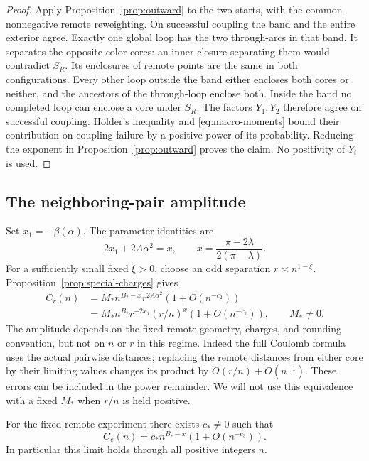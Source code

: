 \begin{proof}
Apply Proposition~\ref{prop:outward} to the two starts, with the common
nonnegative remote reweighting. On successful coupling the band and
the entire exterior agree. Exactly one global loop has the two
through-arcs in that band. It separates the opposite-color cores:
an inner closure separating them would contradict $S_R$. Its
enclosures of remote points are the same in both configurations.
Every other loop outside the band either encloses both cores or
neither, and the ancestors of the through-loop enclose both.
Inside the band no completed loop can enclose a core under $S_R$.
The factors $Y_1,Y_2$ therefore agree on successful coupling.
H\"older's inequality and \eqref{eq:macro-moments} bound their
contribution on coupling failure by a positive power of its probability.
Reducing the exponent in Proposition~\ref{prop:outward} proves the
claim. No positivity of $Y_i$ is used.
\end{proof}

\subsection{The neighboring-pair amplitude}

Set $x_1=-\beta(\alpha)$. The parameter identities are
\begin{equation}\label{eq:exponent-identity}
 2x_1+2A\alpha^2=x,
 \qquad
 x=\frac{\pi-2\lambda}{2(\pi-\lambda)}.
\end{equation}
For a sufficiently small fixed $\xi>0$, choose an odd separation
$r\asymp n^{1-\xi}$. Proposition~\ref{prop:special-charges} gives
\begin{equation}\label{eq:mesoscopic-core}
 \begin{split}
 C_r(n)
 &=M_* n^{B_*-x}r^{2A\alpha^2}(1+O(n^{-c_2}))\\
 &=M_* n^{B_*}r^{-2x_1}(r/n)^x(1+O(n^{-c_2})),
 \qquad M_*\ne0.
 \end{split}
\end{equation}
The amplitude depends on the fixed remote geometry, charges, and
rounding convention, but not on $n$ or $r$ in this regime. Indeed the
full Coulomb formula uses the actual pairwise distances; replacing
the remote distances from either core by their limiting values changes
its product by $O(r/n)+O(n^{-1})$. These errors can be included in
the power remainder. We will not use this equivalence with a fixed
$M_*$ when $r/n$ is held positive.

\begin{proposition}\label{prop:microscopic-amplitude}
For the fixed remote experiment there exists $c_*\ne0$ such that
\begin{equation}\label{eq:microscopic-amplitude}
 C_e(n)=c_*n^{B_*-x}(1+O(n^{-c_3})).
\end{equation}
In particular this limit holds through all positive integers $n$.
\end{proposition}

